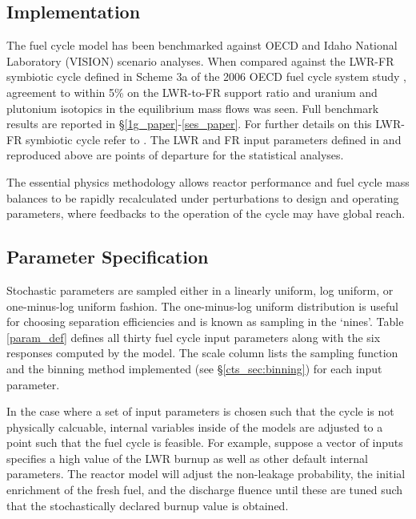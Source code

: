 \subsection{Implementation}
\label{cts_sec:implementation}

The fuel cycle model has been benchmarked against OECD and Idaho National Laboratory
(VISION) scenario analyses. When compared against the LWR-FR symbiotic cycle defined in Scheme
3a of the 2006 OECD fuel cycle system study \cite{NEA-5990}, agreement to within 5\% on the LWR-to-FR support
ratio and uranium and plutonium isotopics in the equilibrium mass flows was seen. Full benchmark
results are reported in \S \ref{1g_paper}-\ref{ses_paper}.  For further details on this LWR-FR
symbiotic cycle refer to \cite{Shropshire2009}. The LWR and FR input parameters defined in
\cite{Shropshire2009} and reproduced above are points of departure for the
statistical analyses.

The essential physics methodology allows reactor performance and fuel cycle mass
balances to be rapidly recalculated under perturbations to design and operating 
parameters, where feedbacks to the operation of the cycle may have global reach.

\subsection{Parameter Specification}
\label{cts_sec:paramspec}

Stochastic parameters are sampled either in a linearly uniform, log uniform, or one-minus-log uniform fashion.
The one-minus-log uniform distribution is useful for choosing separation efficiencies and is known as sampling
in the `nines'.  Table \ref{param_def} defines all thirty fuel cycle input parameters along with the six
responses computed by the model.  The scale column lists the sampling function
and the binning method implemented (see \S \ref{cts_sec:binning}) for each input parameter.



In the case where a set of input parameters is chosen such that the cycle is not physically calcuable,
internal variables inside of the models are adjusted to a point such that the fuel cycle is feasible.
For example, suppose a vector of inputs specifies a high value of the LWR burnup as well as other default
internal parameters.  The reactor model will adjust the non-leakage probability, the initial enrichment
of the fresh fuel, and the discharge fluence until these are tuned such that the stochastically 
declared burnup value is obtained.

